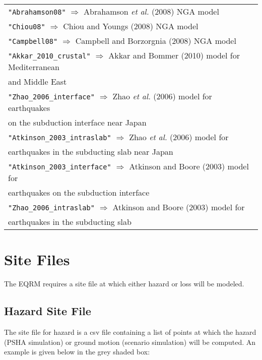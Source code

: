 \begin{tabular}{|p{\textwidth}|}
\texttt{"Abrahamson08"} $\Rightarrow$ Abrahamson \textit{et al.} (2008) NGA model\\
\texttt{"Chiou08"} $\Rightarrow$ Chiou and Youngs (2008) NGA model \\
\texttt{"Campbell08"} $\Rightarrow$ Campbell and Borzorgnia (2008) NGA model \\
\texttt{"Akkar\_2010\_crustal"} $\Rightarrow$ Akkar and Bommer (2010) model for Mediterranean \\
\hspace{8em} and Middle East\\
\texttt{"Zhao\_2006\_interface"} $\Rightarrow$ Zhao \textit{et al.} (2006) model for earthquakes \\
\hspace{8em} on the subduction interface near Japan \\
\texttt{"Atkinson\_2003\_intraslab"} $\Rightarrow$ Zhao \textit{et al.} (2006) model for \\
\hspace{8em} earthquakes in the subducting slab near Japan\\
\texttt{"Atkinson\_2003\_interface"} $\Rightarrow$ Atkinson and Boore (2003) model for \\
\hspace{8em} earthquakes on the subduction interface\\
\texttt{"Zhao\_2006\_intraslab"} $\Rightarrow$ Atkinson and Boore (2003) model for \\
\hspace{8em} earthquakes in the subducting slab \\
\hline
\end{tabular}



\section{Site Files}


The EQRM requires a site file at which either hazard or loss will be modeled.

\subsection{Hazard Site File}

The site file for hazard is a csv file containing a list of points at which the hazard (PSHA simulation)
 or ground motion (scenario simulation) will be computed. An example is
 given below in the grey shaded box:


